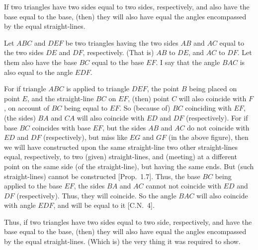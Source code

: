 \begin{Parallel}{}{}
{If two triangles have  two sides equal to two sides, respectively, 
and also have the base equal to the base, (then) they will
also have equal the angles  encompassed by
the equal straight-lines.

Let $ABC$ and $DEF$ be two triangles having the two sides $AB$ and $AC$ equal to the two
sides $DE$ and $DF$, respectively. (That is) $AB$ to $DE$, and $AC$ to $DF$.  Let them also have
the base $BC$ equal to the base $EF$. I say that the angle $BAC$ is also equal
to the angle $EDF$.

\epsfysize=2in
\centerline{}

For if triangle $ABC$ is applied to triangle $DEF$, the point $B$ being placed on
point $E$, and the straight-line $BC$ on $EF$, (then) point $C$ will also coincide with $F$, on
account of $BC$ being equal to $EF$.
So  (because of) $BC$ coinciding with $EF$,  (the sides) $BA$ and $CA$ will also
coincide with  $ED$ and $DF$ (respectively). 
For if base $BC$ coincides with base $EF$, but the sides $AB$ and $AC$ 
do not coincide with $ED$ and $DF$ (respectively), but miss like $EG$
and $GF$ (in the above figure), 
then we will have constructed upon the same straight-line two other straight-lines equal, respectively, to two (given) straight-lines,  and (meeting)
at a different point on the same
side (of the straight-line), but having the same ends. But (such straight-lines) cannot be constructed [Prop.~1.7].
Thus,  the base $BC$ being applied to the  base $EF$,  the sides $BA$ and $AC$
cannot not coincide with $ED$ and $DF$ (respectively). Thus, they
will coincide. So the angle $BAC$ will also coincide with angle $EDF$,
and will be equal to it [C.N.~4].

Thus, if two triangles have  two  sides equal to two side, respectively,
and  have the base equal to the base, (then) they will also have equal the angles  encompassed by
the equal straight-lines. (Which is) the very thing it was required to show.}
\end{Parallel}

